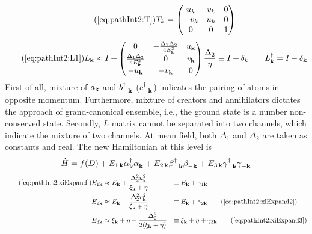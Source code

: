 \begin{equation}\tag{\ref{eq:pathInt2:T}}
T_k=\mtrx{u_k&v_k&0\\-v_k&u_k&0\\0&0&1}
\end{equation}
\begin{equation}\tag{\ref{eq:pathInt2:L1}}
L_{\vk}\approx{}I+
\mtrx{0&-\frac{\Delta_{1}{}\Delta_{2}{}}{4E^{2}_{\vk}}&u_{\vk}\\
\frac{\Delta_{1}{}\Delta_{2}{}}{4E^{2}_{\vk}}&0&v_{\vk}\\
-u_{\vk}&-v_{\vk}&0
}\frac{\Delta_{2}{}}{\eta}
\equiv{}I+\delta_{k}\qquad
L^{\dg}_{\vk}=I-\delta_{\vk}
\end{equation}
First of all, mixture of $a_{\mathbf{k}}$ and $b^{\dagger}_{-\mathbf{k}}$ ($c^{\dagger}_{-\mathbf{k}}$) indicates the pairing of atoms in opposite momentum. Furthermore,   mixture of creators and annihilators dictates the approach of grand-canonical ensemble, i.e., the ground state is a number non-conserved state.   Secondly, $L$ matrix cannot be separated into two channels, which indicate the mixture of two channels.   At mean field, both $\Delta_{1}$ and $\Delta_{2}$ are taken as constants and real.  The new Hamiltonian at this level is 
\begin{equation}
\hat{H}=f(D)+E_{1\,\mathbf{k}}\alpha^{\dagger}_{\mathbf{k}}\alpha^{}_{\mathbf{k}}
+E_{2\,\mathbf{k}}\beta^{\dagger}_{-\mathbf{k}}\beta^{}_{-\mathbf{k}}+E_{3\,\mathbf{k}}\gamma^{\dagger}_{-\mathbf{k}}\gamma^{}_{-\mathbf{k}}
\end{equation}
\begin{align}\tag{\ref{eq:pathInt2:xiExpand}}
E_{1\vk}&\approx{}E_{\vk}+\frac{\Delta_{2}^{2}u_{\vk}^{2}}{\xi_{\vk}+\eta}&\equiv{}&E_{\vk}+\gamma_{1\vk}\\
E_{2\vk}&\approx{}E_{\vk}-\frac{\Delta_{2}^{2}v_{\vk}^{2}}{\xi_{\vk}+\eta}&\equiv{}&E_{\vk}+\gamma_{2\vk}
\tag{\ref{eq:pathInt2:xiExpand2}}\\
E_{3\vk}&\approx{}\xi_{\vk}+\eta-\frac{\Delta_{2}^{2}}{2(\xi_{\vk}+\eta)}&\equiv{}&\xi_{\vk}+\eta+\gamma_{3\vk}
\tag{\ref{eq:pathInt2:xiExpand3}}
\end{align}


